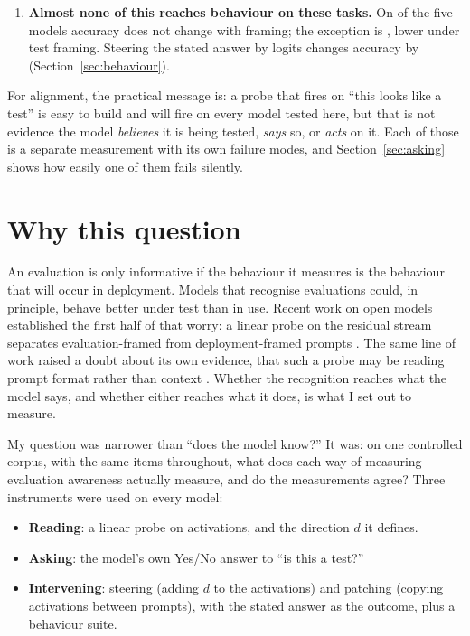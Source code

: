 \documentclass[10pt]{article}
\begin{document}
\begin{enumerate}[leftmargin=1.4em]
  being formed (at the last position on four models, over the question
  tokens on Olmo). Copying the task tokens moves the answer by at most
  \VtaskMaxAbs{} logits on any model, an order of magnitude or more below
  the readout spans. I also describe the wrong control I used first and why
  it fooled me (Section~\ref{sec:patch}).
\item \textbf{Almost none of this reaches behaviour on these tasks.} On
  \VnFramingNull{} of the five models accuracy does not change with framing;
  the exception is \VframingSigModels{}, lower under test framing. Steering
  the stated answer by \NswingDBelief{} logits changes accuracy by
  \NswingDAcc{} (Section~\ref{sec:behaviour}).
\end{enumerate}

For alignment, the practical message is: a probe that fires on
``this looks like a test'' is easy to build and will fire on every model
tested here, but that is not evidence the model \emph{believes} it is being
tested, \emph{says} so, or \emph{acts} on it. Each of those is a separate
measurement with its own failure modes, and Section~\ref{sec:asking} shows how
easily one of them fails silently.

\section{Why this question}

An evaluation is only informative if the behaviour it measures is the
behaviour that will occur in deployment. Models that recognise evaluations
could, in principle, behave better under test than in use. Recent work on
open models established the first half of that worry: a linear probe on the
residual stream separates evaluation-framed from deployment-framed prompts
\citep{nguyen2025probing}. The same line of work raised a doubt about its own
evidence, that such a probe may be reading prompt format rather than context
\citep{devbunova2026format}. Whether the recognition reaches what the model
says, and whether either reaches what it does, is what I set out to
measure.

My question was narrower than ``does the model know?'' It was: on one
controlled corpus, with the same items throughout, what does each way of
measuring evaluation awareness actually measure, and do the measurements
agree? Three instruments were used on every model:
\begin{itemize}[leftmargin=1.4em]
\item \textbf{Reading}: a linear probe on activations, and the direction
  $d$ it defines.
\item \textbf{Asking}: the model's own Yes/No answer to ``is this a test?''
\item \textbf{Intervening}: steering (adding $d$ to the activations) and
  patching (copying activations between prompts), with the stated answer as
  the outcome, plus a behaviour suite.
\end{itemize}
\end{document}
